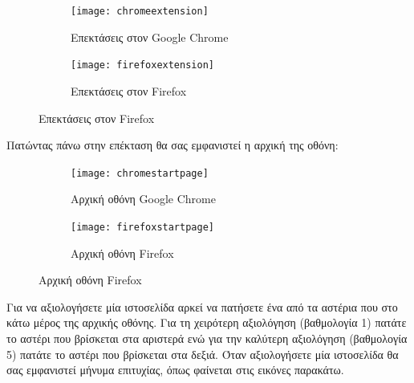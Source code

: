 \documentclass{article}
\begin{document}
\begin{figure}[H]
    \centering
    \begin{minipage}[t]{0.45\textwidth}
        \centering
        \begin{subfigure}[t]{\textwidth}
            \texttt{[image: chromeextension]}
        \caption{Επεκτάσεις στον Google Chrome}
        \label{Fig:chromeextension}
        \end{subfigure}
        \vspace{\fill}
    \end{minipage}
    \hfill
    \begin{minipage}[t]{0.45\textwidth}
        \centering
        \begin{subfigure}[t]{\textwidth}
            \texttt{[image: firefoxextension]}
            \caption{Επεκτάσεις στον Firefox}
            \label{Fig:firefoxextension}
        \end{subfigure}
    \end{minipage}
\end{figure}

Πατώντας πάνω στην επέκταση θα σας εμφανιστεί η αρχική της οθόνη:

\begin{figure}[H]
    \centering
    \begin{minipage}[t]{0.45\textwidth}
        \centering
        \begin{subfigure}[t]{\textwidth}
            \texttt{[image: chromestartpage]}
        \caption{Αρχική οθόνη Google Chrome}
        \label{Fig:chromestartpage}
        \end{subfigure}
        \vspace{\fill}
    \end{minipage}
    \hfill
    \begin{minipage}[t]{0.45\textwidth}
        \centering
        \begin{subfigure}[t]{\textwidth}
            \texttt{[image: firefoxstartpage]}
            \caption{Αρχική οθόνη Firefox}
            \label{Fig:firefoxstartpage}
        \end{subfigure}
    \end{minipage}
\end{figure}

Για να αξιολογήσετε μία ιστοσελίδα αρκεί να πατήσετε ένα από τα αστέρια που στο κάτω μέρος της αρχικής οθόνης. Για τη χειρότερη αξιολόγηση (βαθμολογία 1) πατάτε το αστέρι που βρίσκεται στα αριστερά ενώ για την καλύτερη αξιολόγηση (βαθμολογία 5) πατάτε το αστέρι που βρίσκεται στα δεξιά. Όταν αξιολογήσετε μία ιστοσελίδα θα σας εμφανιστεί μήνυμα επιτυχίας, όπως φαίνεται στις εικόνες παρακάτω.
\end{document}

